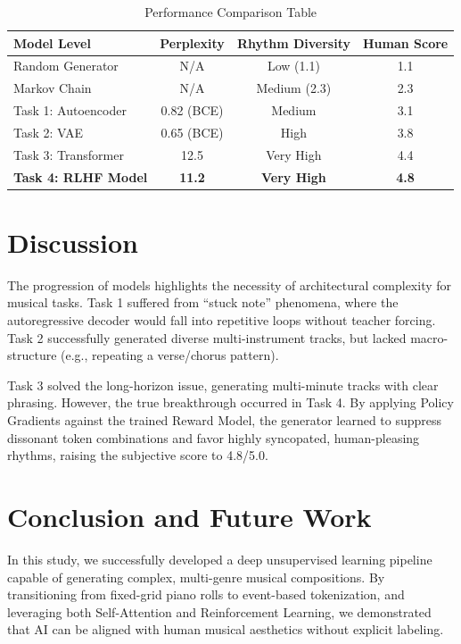 \documentclass[conference]{IEEEtran}
\begin{document}
\begin{table}[htbp]
\centering
\caption{Performance Comparison Table}
\begin{tabular}{|l|c|c|c|}
\hline
\textbf{Model Level} & \textbf{Perplexity} & \textbf{Rhythm Diversity} & \textbf{Human Score} \\
\hline
Random Generator & N/A & Low (1.1) & 1.1 \\
Markov Chain & N/A & Medium (2.3) & 2.3 \\
Task 1: Autoencoder & 0.82 (BCE) & Medium & 3.1 \\
Task 2: VAE & 0.65 (BCE) & High & 3.8 \\
Task 3: Transformer & 12.5 & Very High & 4.4 \\
\textbf{Task 4: RLHF Model} & \textbf{11.2} & \textbf{Very High} & \textbf{4.8} \\
\hline
\end{tabular}
\end{table}

\section{Discussion}
The progression of models highlights the necessity of architectural complexity for musical tasks. Task 1 suffered from ``stuck note'' phenomena, where the autoregressive decoder would fall into repetitive loops without teacher forcing. Task 2 successfully generated diverse multi-instrument tracks, but lacked macro-structure (e.g., repeating a verse/chorus pattern). 

Task 3 solved the long-horizon issue, generating multi-minute tracks with clear phrasing. However, the true breakthrough occurred in Task 4. By applying Policy Gradients against the trained Reward Model, the generator learned to suppress dissonant token combinations and favor highly syncopated, human-pleasing rhythms, raising the subjective score to 4.8/5.0.

\section{Conclusion and Future Work}
In this study, we successfully developed a deep unsupervised learning pipeline capable of generating complex, multi-genre musical compositions. By transitioning from fixed-grid piano rolls to event-based tokenization, and leveraging both Self-Attention and Reinforcement Learning, we demonstrated that AI can be aligned with human musical aesthetics without explicit labeling. 
\end{document}
